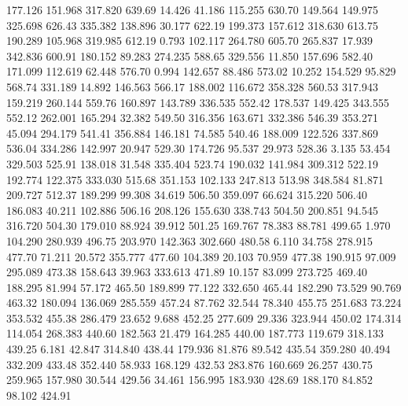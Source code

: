  177.126  151.968  317.820       639.69
  14.426   41.186  115.255       630.70
 149.564  149.975  325.698       626.43
 335.382  138.896   30.177       622.19
 199.373  157.612  318.630       613.75
 190.289  105.968  319.985       612.19
   0.793  102.117  264.780       605.70
 265.837   17.939  342.836       600.91
 180.152   89.283  274.235       588.65
 329.556   11.850  157.696       582.40
 171.099  112.619   62.448       576.70
   0.994  142.657   88.486       573.02
  10.252  154.529   95.829       568.74
 331.189   14.892  146.563       566.17
 188.002  116.672  358.328       560.53
 317.943  159.219  260.144       559.76
 160.897  143.789  336.535       552.42
 178.537  149.425  343.555       552.12
 262.001  165.294   32.382       549.50
 316.356  163.671  332.386       546.39
 353.271   45.094  294.179       541.41
 356.884  146.181   74.585       540.46
 188.009  122.526  337.869       536.04
 334.286  142.997   20.947       529.30
 174.726   95.537   29.973       528.36
   3.135   53.454  329.503       525.91
 138.018   31.548  335.404       523.74
 190.032  141.984  309.312       522.19
 192.774  122.375  333.030       515.68
 351.153  102.133  247.813       513.98
 348.584   81.871  209.727       512.37
 189.299   99.308   34.619       506.50
 359.097   66.624  315.220       506.40
 186.083   40.211  102.886       506.16
 208.126  155.630  338.743       504.50
 200.851   94.545  316.720       504.30
 179.010   88.924   39.912       501.25
 169.767   78.383   88.781       499.65
   1.970  104.290  280.939       496.75
 203.970  142.363  302.660       480.58
   6.110   34.758  278.915       477.70
  71.211   20.572  355.777       477.60
 104.389   20.103   70.959       477.38
 190.915   97.009  295.089       473.38
 158.643   39.963  333.613       471.89
  10.157   83.099  273.725       469.40
 188.295   81.994   57.172       465.50
 189.899   77.122  332.650       465.44
 182.290   73.529   90.769       463.32
 180.094  136.069  285.559       457.24
  87.762   32.544   78.340       455.75
 251.683   73.224  353.532       455.38
 286.479   23.652    9.688       452.25
 277.609   29.336  323.944       450.02
 174.314  114.054  268.383       440.60
 182.563   21.479  164.285       440.00
 187.773  119.679  318.133       439.25
   6.181   42.847  314.840       438.44
 179.936   81.876   89.542       435.54
 359.280   40.494  332.209       433.48
 352.440   58.933  168.129       432.53
 283.876  160.669   26.257       430.75
 259.965  157.980   30.544       429.56
  34.461  156.995  183.930       428.69
 188.170   84.852   98.102       424.91
